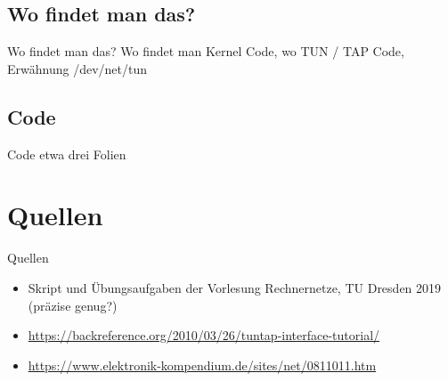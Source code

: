 \documentclass[ngerman,aspectratio=169]{beamer}
\begin{document}
	\subsection{Wo findet man das?}
	\begin{frame}{Wo findet man das?}
		Wo findet man Kernel Code, wo TUN / TAP Code, Erwähnung /dev/net/tun
	\end{frame}
	
	\subsection{Code}
	\begin{frame}{Code}
		etwa drei Folien
	\end{frame}

	\section{Quellen}
	\begin{frame}{Quellen}
		\begin{itemize}
			\item Skript und Übungsaufgaben der Vorlesung Rechnernetze, TU Dresden 2019 (präzise genug?)
			\item \url{https://backreference.org/2010/03/26/tuntap-interface-tutorial/}
			\item \url{https://www.elektronik-kompendium.de/sites/net/0811011.htm}
		\end{itemize}
	\end{frame}
\end{document}
